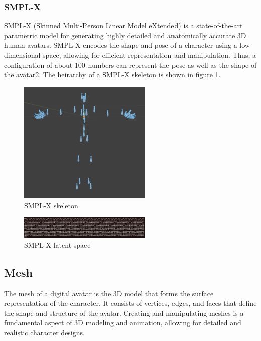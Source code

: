 \documentclass[../../main.tex]{subfiles}
\begin{document}
\subsubsection{SMPL-X}

SMPL-X (Skinned Multi-Person Linear Model eXtended) is a state-of-the-art parametric model for generating highly detailed and anatomically accurate 3D human avatars. SMPL-X encodes the shape and pose of a character using a low-dimensional space, allowing for efficient representation and manipulation. Thus, a configuration of about 100 numbers can represent the pose as well as the shape of the avatar\ref{fig:latent_space_smplx}. The heirarchy of a SMPL-X skeleton is shown in figure \ref{fig:smpl_x_skeleton}.

\begin{figure}
  \centering \includegraphics[width = 2.5in]{chapters/background_work/images/smpl_x_skeleton.png}
  \caption{SMPL-X skeleton}
  \label{fig:smpl_x_skeleton}
\end{figure}

\begin{figure}
  \centering \includegraphics[width = 2.5in]{chapters/background_work/images/latent_space_smplx.png}
  \caption{SMPL-X latent space}
  \label{fig:latent_space_smplx}
\end{figure}

\subsection{Mesh}

The mesh of a digital avatar is the 3D model that forms the surface representation of the character. It consists of vertices, edges, and faces that define the shape and structure of the avatar. Creating and manipulating meshes is a fundamental aspect of 3D modeling and animation, allowing for detailed and realistic character designs.
\end{document}
